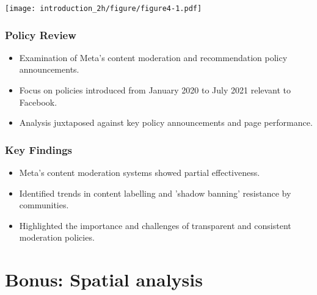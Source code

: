 \documentclass[serif, aspectratio=169]{beamer}
\begin{document}
\begin{frame}

\texttt{[image: introduction\_2h/figure/figure4-1.pdf]}

\end{frame}

\begin{frame}
\frametitle{Policy Review}
\begin{itemize}
    \item Examination of Meta's content moderation and recommendation policy announcements.
    \item Focus on policies introduced from January 2020 to July 2021 relevant to Facebook.
    \item Analysis juxtaposed against key policy announcements and page performance.
\end{itemize}
\end{frame}

\begin{frame}
\frametitle{Key Findings}
\begin{itemize}
    \item Meta's content moderation systems showed partial effectiveness.
    \item Identified trends in content labelling and 'shadow banning' resistance by communities.
    \item Highlighted the importance and challenges of transparent and consistent moderation policies.
\end{itemize}
\end{frame}


\section{Bonus: Spatial analysis}
\end{document}
